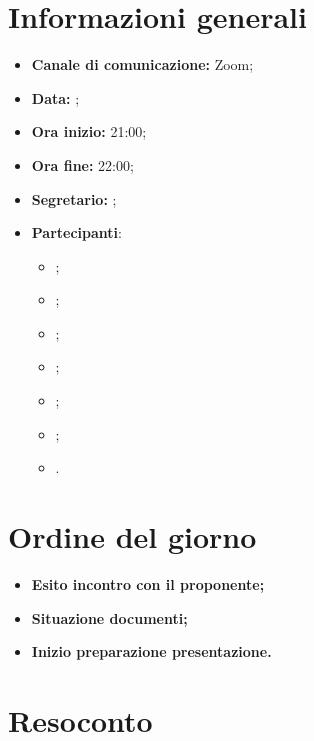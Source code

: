 \section{Informazioni generali}

\begin{itemize}

    \item \textbf{Canale di comunicazione:} Zoom;

    \item \textbf{Data:} \DataMeeting{};

    \item \textbf{Ora inizio:} 21:00;

    \item \textbf{Ora fine:} 22:00;

    \item \textbf{Segretario:} \ACapoRedazione{};

    \item \textbf{Partecipanti}:
        \begin{itemize}
            \item \Daniele{};
            \item \Davide{};
            \item \Francesco{};
            \item \Giosue{};
            \item \Lucrezia{};
            \item \Matteo{};
            \item \Tommaso{}.
        \end{itemize}
\end{itemize}

\section{Ordine del giorno}

\begin{itemize}
    \item\textbf{Esito incontro con il proponente;}
    \item\textbf{Situazione documenti;}
    \item\textbf{Inizio preparazione presentazione.}
\end{itemize}
\newpage


\section{Resoconto}

